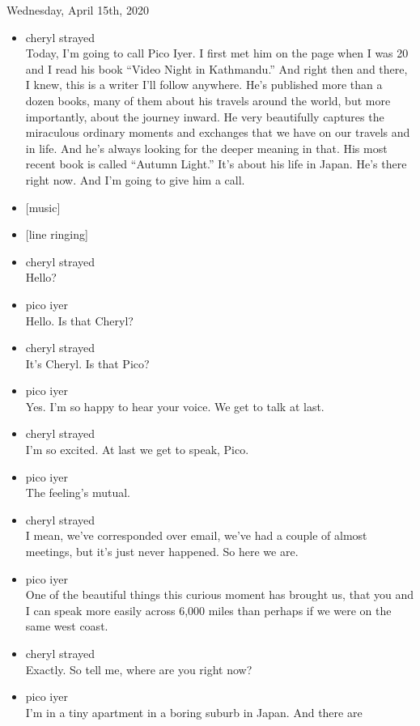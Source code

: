 Wednesday, April 15th, 2020

\begin{itemize}
\item
  cheryl strayed\\
  Today, I'm going to call Pico Iyer. I first met him on the page when I
  was 20 and I read his book ``Video Night in Kathmandu.'' And right
  then and there, I knew, this is a writer I'll follow anywhere. He's
  published more than a dozen books, many of them about his travels
  around the world, but more importantly, about the journey inward. He
  very beautifully captures the miraculous ordinary moments and
  exchanges that we have on our travels and in life. And he's always
  looking for the deeper meaning in that. His most recent book is called
  ``Autumn Light.'' It's about his life in Japan. He's there right now.
  And I'm going to give him a call.
\item
  {[}music{]}
\item
  {[}line ringing{]}
\item
  cheryl strayed\\
  Hello?
\item
  pico iyer\\
  Hello. Is that Cheryl?
\item
  cheryl strayed\\
  It's Cheryl. Is that Pico?
\item
  pico iyer\\
  Yes. I'm so happy to hear your voice. We get to talk at last.
\item
  cheryl strayed\\
  I'm so excited. At last we get to speak, Pico.
\item
  pico iyer\\
  The feeling's mutual.
\item
  cheryl strayed\\
  I mean, we've corresponded over email, we've had a couple of almost
  meetings, but it's just never happened. So here we are.
\item
  pico iyer\\
  One of the beautiful things this curious moment has brought us, that
  you and I can speak more easily across 6,000 miles than perhaps if we
  were on the same west coast.
\item
  cheryl strayed\\
  Exactly. So tell me, where are you right now?
\item
  pico iyer\\
  I'm in a tiny apartment in a boring suburb in Japan. And there are

\end{itemize}
